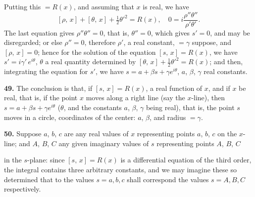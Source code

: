 \documentclass[11pt]{article}
\newcommand{\artno}[1]{\textbf{#1.}\quad}
\begin{document}
Putting this $= R(x)$, and assuming that $x$ is real, we have
\[
   [\rho,\,x] + [\theta,\,x] + \tfrac{1}{2}\theta'^{2} = R(x),\quad 0 = i\frac{\rho''\theta''}{\rho'\theta'}.
\]
The last equation gives $\rho''\theta'' = 0$, that is, $\theta'' = 0$, which gives $s' = 0$, and may be
disregarded; or else $\rho'' = 0$, therefore $\rho'$, a real constant, $= \gamma$ suppose, and $[\rho,\,x] = 0$;
hence for the solution of the equation $[s,\,x] = R(x)$, we have $s' = i\gamma'\,e^{i\theta}$, $\theta$ a real
quantity determined by $[\theta,\,x] + \tfrac{1}{2}\theta'^{2} = R(x)$; and then, integrating the equation for $s'$,
we have $s = a + \beta s + \gamma e^{i\theta}$, $a$, $\beta$, $\gamma$ real constants.

\artno{49} The conclusion is that, if $[s,\,x] = R(x)$, a real function of $x$, and if $x$ be
real, that is, if the point $x$ moves along a right line (say the $x$-line), then $s = a + \beta s + \gamma e^{i\theta}$
($\theta$, and the constants $a$, $\beta$, $\gamma$ being real), that is, the point $s$ moves in a circle,
coordinates of the center: $a$, $\beta$, and radius $= \gamma$.

\begin{center}
\end{center}

\artno{50} Suppose $a$, $b$, $c$ are any real values of $x$ representing points $a$, $b$, $c$ on the
$x$-line; and $A$, $B$, $C$ any given imaginary values of $s$ representing points $A$, $B$, $C$

\newpage
in the $s$-plane: since $[s,\,x] = R(x)$ is a differential equation of the third order, the
integral contains three arbitrary constants, and we may imagine these so determined
that to the values $s = a, b, c$ shall correspond the values $s = A, B, C$ respectively.
\end{document}
